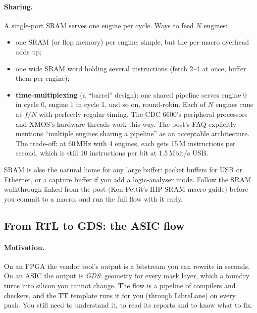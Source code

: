 \paragraph{Sharing.} A single-port SRAM serves one engine per cycle. Ways to
feed $N$ engines:
\begin{itemize}
  \item one SRAM (or flop memory) per engine: simple, but the per-macro
    overhead adds up;
  \item one wide SRAM word holding several instructions (fetch 2--4 at
    once, buffer them per engine);
  \item \textbf{time-multiplexing} (a ``barrel'' design): one shared
    pipeline serves engine 0 in cycle 0, engine 1 in cycle 1, and so on,
    round-robin. Each of $N$ engines runs at $f/N$ with perfectly regular
    timing. The CDC 6600's peripheral processors and XMOS's hardware
    threads work this way. The post's FAQ explicitly mentions ``multiple
    engines sharing a pipeline'' as an acceptable architecture. The
    trade-off: at 60\,MHz with 4 engines, each gets 15\,M instructions per
    second, which is still 10 instructions per bit at 1.5\,Mbit/s USB.
\end{itemize}
SRAM is also the natural home for any large buffer: packet buffers for USB
or Ethernet, or a capture buffer if you add a logic-analyser mode. Follow the
SRAM walkthrough linked from the post (Ken Pettit's IHP SRAM macro guide)
before you commit to a macro, and run the full flow with it early.

\subsection{From RTL to GDS: the ASIC flow}\label{sec:flow}

\paragraph{Motivation.} On an FPGA the vendor tool's output is a bitstream
you can rewrite in seconds. On an ASIC the output is \emph{GDS}: geometry
for every mask layer, which a foundry turns into silicon you cannot change.
The flow is a pipeline of compilers and checkers, and the TT template runs
it for you (through LibreLane) on every push. You still need to understand
it, to read its reports and to know what to fix.

